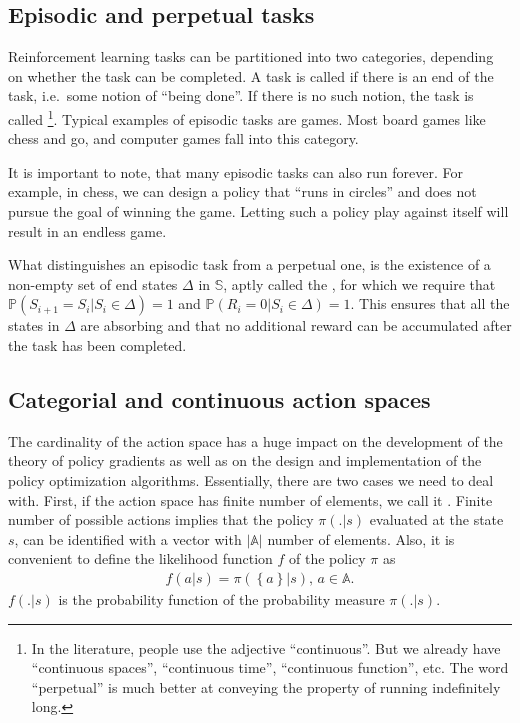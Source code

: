 \documentclass[a4paper,12pt]{amsart}
\newcommand{\stateSpace}{\mathbb S}
\newcommand{\coffinSpace}{\Delta}
\newcommand{\actionSpace}{\mathbb A}
\newcommand{\policy}{\pi}
\newcommand{\policyLik}{f}
\newcommand{\prob}{\mathbb P}
\begin{document}
\subsection{Episodic and perpetual tasks} 
Reinforcement learning tasks can be partitioned into two categories, depending
on whether the task can be completed. A task is called  if
there is an end of the task, i.e.\ some notion of ``being done''.
If there is no such notion, the task is called 
\footnote{In the literature, people use the adjective ``continuous''.
    But we already have ``continuous spaces'', ``continuous time'', ``continuous function'', etc.
    The word ``perpetual'' is much better at conveying the property 
    of running indefinitely long. 
}.
Typical examples of episodic tasks are games. Most board games like chess and
go, and computer games fall into this category.

It is important to note, that many episodic tasks can also run 
forever. For example, in chess, we can design a policy that ``runs in circles''
and does not pursue the goal of winning the game. Letting such a 
policy play against itself will result in an endless game.

What distinguishes an episodic task from a perpetual one, is the existence of
a non-empty set of end states $\coffinSpace$ in $\stateSpace$, aptly called the
, for which we require that $\prob\left( S_{i+1} = S_{i} |
S_{i} \in \coffinSpace \right) = 1$ and $\prob\left( R_{i} = 0 | S_{i} \in
\coffinSpace \right) = 1$. This ensures that all the states in $\coffinSpace$
are absorbing and that no additional reward can be accumulated after the task
has been completed.

\subsection{Categorial and continuous action spaces}
The cardinality of the action space has a huge impact on the development of the
theory of policy gradients as well as on the design and implementation of
the policy optimization algorithms.
Essentially, there are two cases we need to deal with. First, if the action
space has finite number of elements, we call it . Finite
number of possible actions implies that the policy $\policy(.|s)$ evaluated at
the state $s$, can be identified with a vector with $|\actionSpace|$ number of
elements. Also, it is convenient to define the likelihood function $\policyLik$
of the policy $\policy$ as 
\begin{align*}
    \policyLik(a | s) = \policy(\left\{a \right\}|s), \, a\in \actionSpace.
\end{align*}
$\policyLik(.|s)$ is the probability function of the probability measure 
$\policy(.|s)$.
\end{document}
